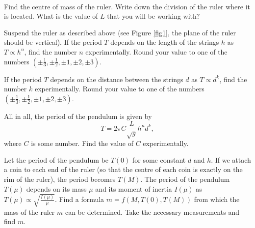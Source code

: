 \documentclass[../TST.tex]{subfiles}
\begin{document}
\begin{eproblem}{\ \\[5pt]}
\begin{subpart}
	\item Find the centre of mass of the ruler. Write down the division of the ruler where it is located. What is the value of $L$ that you will be working with?  
	\item Suspend the ruler as described above (see Figure \ref{fig1}, the plane of the ruler should be vertical). If the period $T$ depends on the length of the strings $h$ as $T\propto h^n$, find the number $n$ experimentally. Round your value to one of the numbers $\left(\pm\frac{1}{3},\pm\frac{1}{2},\pm 1,\pm 2,\pm 3\right)$. \phantom{aaaaahhhhh}\hfill{}
	\item If the period $T$ depends on the distance between the strings $d$ as $T\propto d^k$, find the number $k$ experimentally. Round your value to one of the numbers $\left(\pm\frac{1}{3},\pm\frac{1}{2},\pm 1,\pm 2,\pm 3\right)$. \phantom{aaaaahhhhhh}\hfill {}
	\item All in all, the period of the pendulum is given by
		\begin{equation*}
			T=2\pi C \frac{L}{\sqrt{g}} h^n d^k
		,
		\end{equation*}
	where $C$ is some number. Find the value of $C$ experimentally.	
	\item Let the period of the pendulum be $T(0)$ for some constant $d$ and $h$.
		If we attach a coin to each end of the ruler (so that the centre of each coin is exactly on the rim of the ruler), the period becomes $T(M)$. The period of the pendulum $T(\mu)$ depends on its mass $\mu$ and its moment of inertia $I(\mu)$ as $T(\mu)\propto \sqrt{\frac{I(\mu)}{\mu}}$. Find a formula $m=f(M,T(0),T(M))$ from which the mass of the ruler $m$ can be determined. Take the necessary measurements and find $m$.
\end{subpart}

\end{eproblem}
\end{document}

